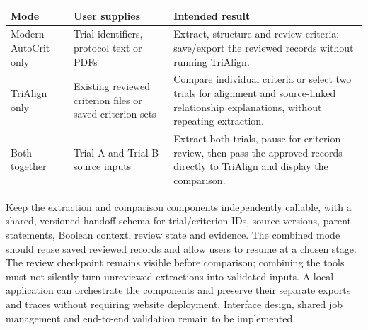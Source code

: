 \documentclass[10pt,letterpaper]{article}
\begin{document}
\begin{longtable}{L{.20\linewidth}L{.34\linewidth}L{.37\linewidth}}
\toprule Mode & User supplies & Intended result\\\midrule
\endhead
Modern AutoCrit only & Trial identifiers, protocol text or PDFs & Extract, structure and review criteria; save/export the reviewed records without running TriAlign.\\
TriAlign only & Existing reviewed criterion files or saved criterion sets & Compare individual criteria or select two trials for alignment and source-linked relationship explanations, without repeating extraction.\\
Both together & Trial A and Trial B source inputs & Extract both trials, pause for criterion review, then pass the approved records directly to TriAlign and display the comparison.\\\bottomrule
\end{longtable}

Keep the extraction and comparison components independently callable, with a
shared, versioned handoff schema for trial/criterion IDs, source versions,
parent statements, Boolean context, review state and evidence. The combined
mode should reuse saved reviewed records and allow users to resume at a
chosen stage. The review checkpoint remains visible before comparison;
combining the tools must not silently turn unreviewed extractions into
validated inputs. A local application can orchestrate the components and
preserve their separate exports and traces without requiring website
deployment. Interface design, shared job management and end-to-end validation
remain to be implemented.
\end{document}

